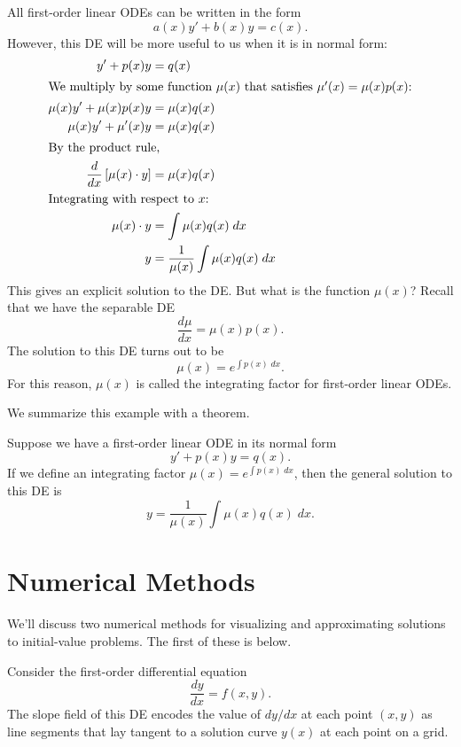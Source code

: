 \documentclass[../m082main.tex]{subfiles}
\begin{document}
\pagebreak

\begin{example}
    All first-order linear ODEs can be written in the form
    \[ a(x)y' + b(x)y = c(x). \]
    However, this DE will be more useful to us when it is in normal form:
    \begin{align*}
        y' + p(x)y &= q(x) \\
        \intertext{We multiply by some function $\mu(x)$ that satisfies $\mu'(x) = \mu(x)p(x)$:}
        \mu(x)y' + \mu(x)p(x)y &= \mu(x)q(x) \\
        \mu(x)y' + \mu'(x)y &= \mu(x)q(x) \\
        \intertext{By the product rule,}
        \frac{d}{dx} \left[ \mu(x) \cdot y \right] &= \mu(x)q(x) \\
        \intertext{Integrating with respect to $x$:}
        \mu(x) \cdot y &= \int \mu(x)q(x) \;dx \\
        y &= \frac{1}{\mu(x)} \int \mu(x)q(x) \;dx
    \end{align*}
    This gives an explicit solution to the DE.
    But what is the function $\mu(x)$?
    Recall that we have the separable DE
    \[ \frac{d\mu}{dx} = \mu(x)p(x). \]
    The solution to this DE turns out to be
    \[ \mu(x) = e^{\int p(x) \;dx}. \]
    For this reason, $\mu(x)$ is called the integrating factor for first-order linear ODEs. 
\end{example}

We summarize this example with a theorem.

\begin{theorem}
    Suppose we have a first-order linear ODE in its normal form
    \[ y' + p(x)y = q(x). \]
    If we define an integrating factor $\mu(x) = e^{\int p(x) \;dx}$, then the general solution to this DE is
    \[ y = \frac{1}{\mu(x)} \int \mu(x)q(x) \;dx. \]
\end{theorem}

\section{Numerical Methods}
We'll discuss two numerical methods for visualizing and approximating solutions to initial-value problems.
The first of these is below.

\pagebreak

\begin{definition}
Consider the first-order differential equation
\[ \frac{dy}{dx} = f(x, y). \]
The slope field of this DE encodes the value of $dy / dx$ at each point $(x, y)$ as line segments that lay tangent to a solution curve $y(x)$ at each point on a grid.
\end{definition}
\end{document}
